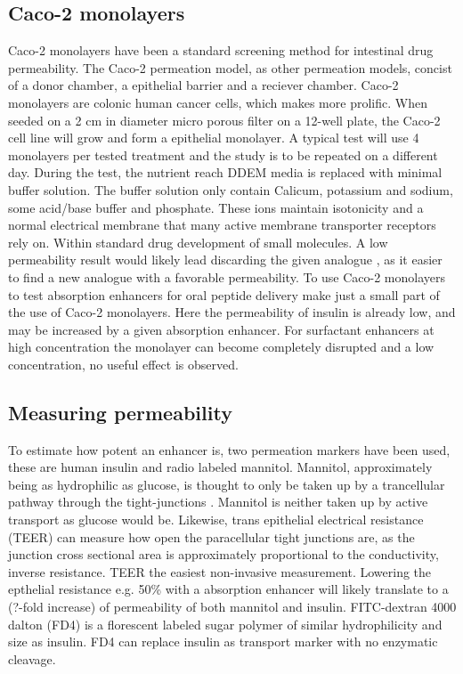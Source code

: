 \subsection{Caco-2 monolayers}
Caco-2 monolayers have been a standard screening method for intestinal drug permeability. The Caco-2 permeation model, as other permeation models, concist of a donor chamber, a epithelial barrier and a reciever chamber. Caco-2 monolayers are colonic human cancer cells, which makes more prolific. When seeded on a 2 cm in diameter micro porous filter on a 12-well plate, the Caco-2 cell line will grow and form a epithelial monolayer. A typical test will use 4 monolayers per tested treatment and the study is to be repeated on a different day. During the test, the nutrient reach DDEM media is replaced with minimal buffer solution. The buffer solution only contain Calicum, potassium and sodium, some acid/base buffer and phosphate. These ions maintain isotonicity and a normal electrical membrane that many active membrane transporter receptors rely on. Within standard drug development of small molecules. A low permeability result would likely lead discarding the given analogue , as it easier to find a new analogue with a favorable permeability. To use Caco-2 monolayers to test absorption enhancers for oral peptide delivery make just a small part of the use of Caco-2 monolayers. Here the permeability of insulin is already low, and may be increased by a given absorption enhancer. For surfactant enhancers at high concentration the monolayer can become completely disrupted and a low concentration, no useful effect is observed.

\subsection{Measuring permeability}
To estimate how potent an enhancer is, two permeation markers have been used, these are human insulin and radio labeled mannitol. Mannitol, approximately being as hydrophilic as glucose, is thought to only be taken up by a trancellular pathway through the tight-junctions \cite{anderberg1992epithelial,artursson1994effect}. Mannitol is neither taken up by active transport as glucose would be. Likewise, trans epithelial electrical resistance (TEER) can measure how open the paracellular tight junctions are, as the junction cross sectional area is approximately proportional to the conductivity, inverse resistance. TEER the easiest non-invasive measurement. Lowering the epthelial resistance e.g. 50\% with a absorption enhancer will likely translate to a (?-fold increase) of permeability of both mannitol and insulin. FITC-dextran 4000 dalton (FD4) is a florescent labeled sugar polymer of similar hydrophilicity and size as insulin. FD4 can replace insulin as transport marker with no enzymatic cleavage.

